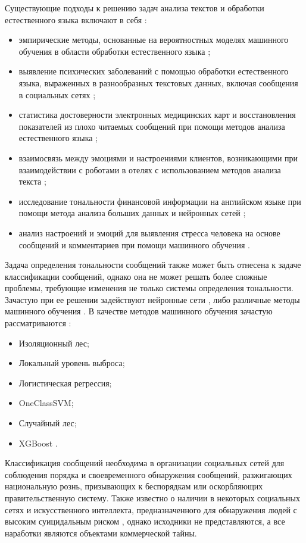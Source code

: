 Существующие подходы к решению задач анализа текстов и обработки естественного языка включают в себя \cite{classificationPromlems}:

\begin{itemize}
	\item эмпирические методы, основанные на вероятностных моделях машинного обучения в области обработки естественного языка \cite{shit1};
	\item выявление психических заболеваний с помощью обработки естественного языка, выраженных в разнообразных текстовых данных, включая сообщения в социальных сетях \cite{shit2};
	\item статистика достоверности электронных медицинских карт и восстановления показателей из плохо читаемых сообщений при помощи методов анализа естественного языка \cite{shit3};
	\item взаимосвязь между эмоциями и настроениями клиентов, возникающими при взаимодействии с роботами в отелях с использованием методов анализа текста \cite{shit4};
	\item исследование тональности финансовой информации на английском языке при помощи метода анализа больших данных и нейронных сетей \cite{shit5};
	\item анализ настроений и эмоций для выявления стресса человека на основе сообщений и комментариев при помощи машинного обучения \cite{shit6}.
\end{itemize}

Задача определения тональности сообщений также может быть отнесена к задаче классификации сообщений, однако она не может решать более сложные проблемы, требующие изменения не только системы определения тональности. 
Зачастую при ее решении задействуют нейронные сети \cite{classificationPromlems}, либо различные методы машинного обучения \cite{presuicidalSignals}.
В качестве методов машинного обучения зачастую рассматриваются \cite{presuicidalSignals}:

\begin{itemize}
	\item Изоляционный лес;
	\item Локальный уровень выброса;
	\item Логистическая регрессия;
	\item OneClassSVM;
	\item Случайный лес;
	\item XGBoost \cite{boosting}.
\end{itemize}

Классификация сообщений необходима в организации социальных сетей для соблюдения порядка и своевременного обнаружения сообщений, разжигающих национальную рознь, призывающих к беспорядкам или оскорбляющих правительственную систему.
Также известно о наличии в некоторых социальных сетях и искусственного интеллекта, предназначенного для обнаружения людей с высоким суицидальным риском \cite{faceSuicide}, однако исходники не представляются, а все наработки являются объектами коммерческой тайны.


